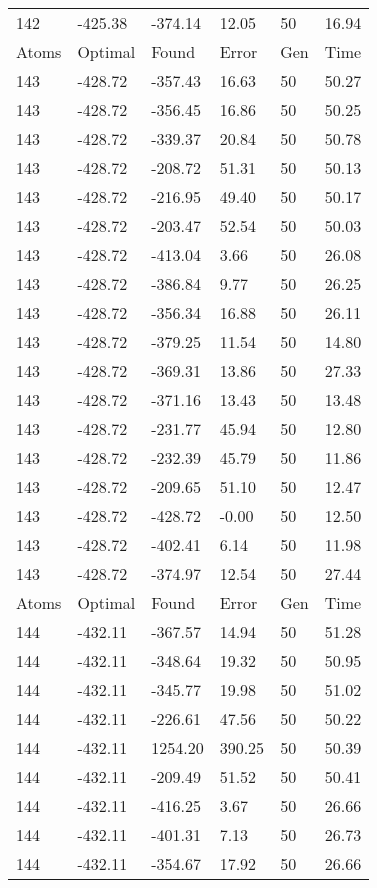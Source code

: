 \documentclass{report}
\begin{document}
\begin{appendix}
\begin{longtable}{llllll}
142 & -425.38 & -374.14 & 12.05 & 50 & 16.94 \\
Atoms & Optimal & Found & Error & Gen & Time \\
143 & -428.72 & -357.43 & 16.63 & 50 & 50.27 \\
143 & -428.72 & -356.45 & 16.86 & 50 & 50.25 \\
143 & -428.72 & -339.37 & 20.84 & 50 & 50.78 \\
143 & -428.72 & -208.72 & 51.31 & 50 & 50.13 \\
143 & -428.72 & -216.95 & 49.40 & 50 & 50.17 \\
143 & -428.72 & -203.47 & 52.54 & 50 & 50.03 \\
143 & -428.72 & -413.04 & 3.66 & 50 & 26.08 \\
143 & -428.72 & -386.84 & 9.77 & 50 & 26.25 \\
143 & -428.72 & -356.34 & 16.88 & 50 & 26.11 \\
143 & -428.72 & -379.25 & 11.54 & 50 & 14.80 \\
143 & -428.72 & -369.31 & 13.86 & 50 & 27.33 \\
143 & -428.72 & -371.16 & 13.43 & 50 & 13.48 \\
143 & -428.72 & -231.77 & 45.94 & 50 & 12.80 \\
143 & -428.72 & -232.39 & 45.79 & 50 & 11.86 \\
143 & -428.72 & -209.65 & 51.10 & 50 & 12.47 \\
143 & -428.72 & -428.72 & -0.00 & 50 & 12.50 \\
143 & -428.72 & -402.41 & 6.14 & 50 & 11.98 \\
143 & -428.72 & -374.97 & 12.54 & 50 & 27.44 \\
Atoms & Optimal & Found & Error & Gen & Time \\
144 & -432.11 & -367.57 & 14.94 & 50 & 51.28 \\
144 & -432.11 & -348.64 & 19.32 & 50 & 50.95 \\
144 & -432.11 & -345.77 & 19.98 & 50 & 51.02 \\
144 & -432.11 & -226.61 & 47.56 & 50 & 50.22 \\
144 & -432.11 & 1254.20 & 390.25 & 50 & 50.39 \\
144 & -432.11 & -209.49 & 51.52 & 50 & 50.41 \\
144 & -432.11 & -416.25 & 3.67 & 50 & 26.66 \\
144 & -432.11 & -401.31 & 7.13 & 50 & 26.73 \\
144 & -432.11 & -354.67 & 17.92 & 50 & 26.66 \\

\end{longtable}
\end{appendix}
\end{document}
